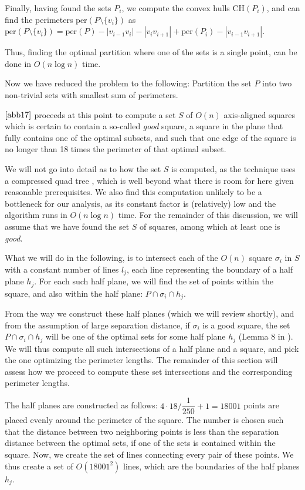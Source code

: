 \documentclass{article}
\begin{document}
Finally, having found the sets $P_i$, we compute the convex hulls $\text{CH}(P_i)$, and can find the perimeters $\text{per}(P \setminus \{v_i\})$ as $\text{per}(P \setminus \{v_i\}) = \text{per}(P) - |v_{i - 1}v_i| - |v_iv_{i + 1}| + \text{per}(P_i) - |v_{i - 1}v_{i + 1}|$.

Thus, finding the optimal partition where one of the sets is a single point, can be done in $O(n \log n)$ time.

Now we have reduced the problem to the following: Partition the set $P$ into two non-trivial sets with smallest sum of perimeters. 

$\cite{abb17}$ proceeds at this point to compute a set $S$ of $O(n)$ axis-aligned squares which is certain to contain a so-called \textit{good} square,  a square in the plane that fully contains one of the optimal subsets, and such that one edge of the square is no longer than 18 times the perimeter of that optimal subset.

We will not go into detail as to how the set $S$ is computed, as the technique uses a compressed quad tree \cite{quad_trees}, which is well beyond what there is room for here given reasonable prerequisites. We also find this computation unlikely to be a bottleneck for our analysis, as its constant factor is (relatively) low and the algorithm runs in $O(n \log n)$ time. For the remainder of this discussion, we will assume that we have found the set $S$ of squares, among which at least one is \textit{good}.

What we will do in the following, is to intersect each of the $O(n)$ square $\sigma_i$ in $S$ with a constant number of lines $l_j$, each line representing the boundary of a half plane $h_j$. For each such half plane, we will find the set of points within the square, and also within the half plane: $P \cap \sigma_i \cap h_j$. 

From the way we construct these half planes (which we will review shortly), and from the assumption of large separation distance, if $\sigma_i$ is a good square, the set $P \cap \sigma_i \cap h_j$ will be one of the optimal sets for some half plane $h_j$ (Lemma 8 in \cite{abb17}). We will thus compute all such intersections of a half plane and a square, and pick the one optimizing the perimeter lengths. The remainder of this section will assess how we proceed to compute these set intersections and the corresponding perimeter lengths.

The half planes are constructed as follows: $4 \cdot 18 / \dfrac{1}{250} + 1 = 18001$ points are placed evenly around the perimeter of the square. The number is chosen such that the distance between two neighboring points is less than the separation distance between the optimal sets, if one of the sets is contained within the square. Now, we create the set of lines connecting every pair of these points. We thus create a set of $O(18001^2)$ lines, which are the boundaries of the half planes $h_j$.
\end{document}
